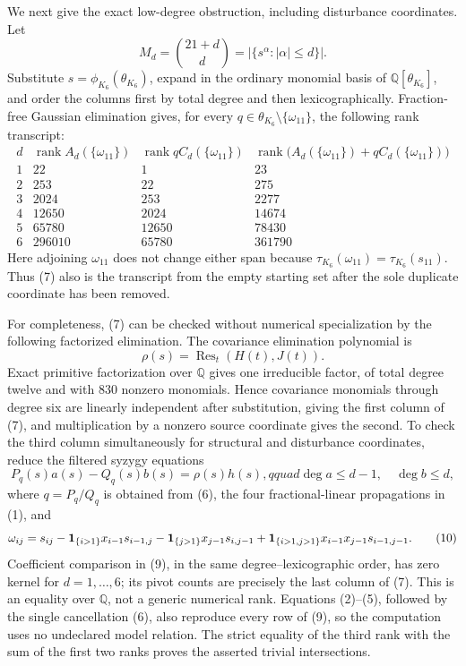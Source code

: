 We next give the exact low-degree obstruction, including disturbance coordinates.  Let
\[
 M_d=\binom{21+d}{d}=|\{s^\alpha:|\alpha|\leq d\}|.
\]
Substitute \(s=\phi_{K_6}(\theta_{K_6})\), expand in the ordinary monomial basis of \(\mathbb Q[\theta_{K_6}]\), and order the columns first by total degree and then lexicographically.  Fraction-free Gaussian elimination gives, for every
\(q\in\theta_{K_6}\setminus\{\omega_{11}\}\), the following rank transcript:
\[
\begin{array}{c|r|r|r}
 d&\operatorname{rank}A_d(\{\omega_{11}\})
   &\operatorname{rank}qC_d(\{\omega_{11}\})
   &\operatorname{rank}\bigl(A_d(\{\omega_{11}\})+qC_d(\{\omega_{11}\})\bigr)\\ \hline
1&22&1&23\\
2&253&22&275\\
3&2024&253&2277\\
4&12650&2024&14674\\
5&65780&12650&78430\\
6&296010&65780&361790
\end{array} \tag{7}
\]
Here adjoining \(\omega_{11}\) does not change either span because \(\tau_{K_6}(\omega_{11})=\tau_{K_6}(s_{11})\).  Thus (7) also is the transcript from the empty starting set after the sole duplicate coordinate has been removed.

For completeness, (7) can be checked without numerical specialization by the following factorized elimination.  The covariance elimination polynomial is
\[
 \rho(s)=\operatorname{Res}_{t}(H(t),J(t)). \tag{8}
\]
Exact primitive factorization over \(\mathbb Q\) gives one irreducible factor, of total degree twelve and with \(830\) nonzero monomials.  Hence covariance monomials through degree six are linearly independent after substitution, giving the first column of (7), and multiplication by a nonzero source coordinate gives the second.  To check the third column simultaneously for structural and disturbance coordinates, reduce the filtered syzygy equations
\[
 P_q(s)a(s)-Q_q(s)b(s)=\rho(s)h(s),qquad
 \deg a\leq d-1,\quad \deg b\leq d, \tag{9}
\]
where \(q=P_q/Q_q\) is obtained from (6), the four fractional-linear propagations in (1), and
\[
 \omega_{ij}=s_{ij}-{\bf1}_{\{i>1\}}x_{i-1}s_{i-1,j}
 -{\bf1}_{\{j>1\}}x_{j-1}s_{i,j-1}
 +{\bf1}_{\{i>1,j>1\}}x_{i-1}x_{j-1}s_{i-1,j-1}. \tag{10}
\]
Coefficient comparison in (9), in the same degree--lexicographic order, has zero kernel for \(d=1,\ldots,6\); its pivot counts are precisely the last column of (7).  This is an equality over \(\mathbb Q\), not a generic numerical rank.  Equations (2)--(5), followed by the single cancellation (6), also reproduce every row of (9), so the computation uses no undeclared model relation.  The strict equality of the third rank with the sum of the first two ranks proves the asserted trivial intersections.

